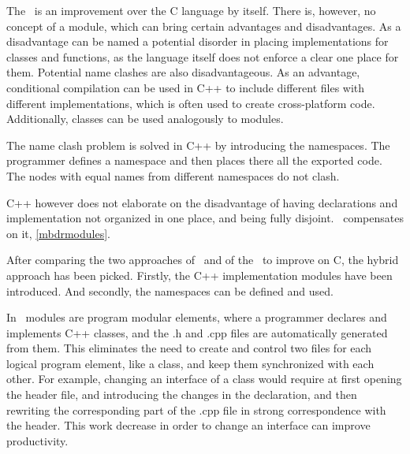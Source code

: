 
% 

The \cpppl\ is an improvement over the C language by itself. There is, however, no concept of a module,
which can bring certain advantages and disadvantages. As a disadvantage can be named a potential disorder
in placing implementations for classes and functions, as the language itself does not enforce a clear
one place for them. Potential name clashes are also disadvantageous. 
As an advantage, conditional compilation can be used in C++ to include different files
with different implementations, which is often used to create cross-platform code. Additionally, classes
can be used analogously to modules.

The name clash problem is solved in C++ by introducing the namespaces. The programmer defines a namespace 
and then places there all the exported code. The nodes with equal names from different namespaces do not clash.

C++ however does not elaborate on the disadvantage of having declarations and implementation not organized in 
one place, and being fully disjoint. \mbdr\ compensates on it, \ref{mbdrmodules}.

After comparing the two approaches of \mbdr\ and of the \cpppl\ to improve on C, the hybrid approach
has been picked. Firstly, the C++ implementation modules have been introduced. And secondly, the namespaces
can be defined and used.

In \pcpp\ modules are program modular elements, where a programmer declares and implements C++ classes,
and the .h and .cpp files are automatically generated from them. This eliminates the need to 
create and control two files for each logical program element, like a class, and keep them synchronized with
each other. For example, changing an interface of a class would require at first opening the header file, 
and introducing the changes in the declaration, and then rewriting the corresponding part of the .cpp file 
in strong correspondence with the header. This work decrease in order to change an interface can improve productivity.

